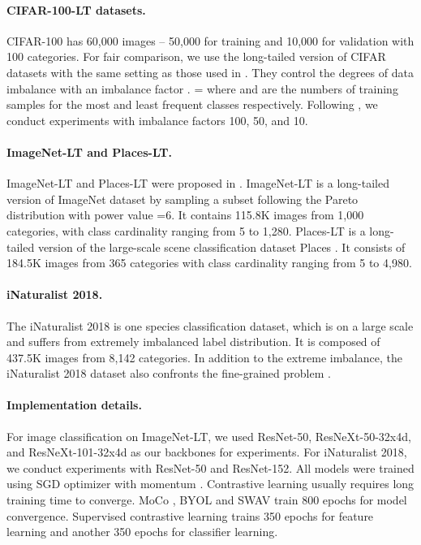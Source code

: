 \documentclass[10pt,twocolumn,letterpaper]{article}
\begin{document}
\paragraph{CIFAR-100-LT datasets.}
CIFAR-100 has 60,000 images -- 50,000 for training and 10,000 for validation with 100 categories. For fair comparison, we use the long-tailed version of CIFAR datasets with the same setting as those used in \cite{cao2019learning, zhou2019bbn, cb-focal}. They control the degrees of data imbalance with an imbalance factor . =  where  and  are the numbers of training samples for the most and least frequent classes respectively. Following \cite{zhou2019bbn}, we conduct experiments with imbalance factors 100, 50, and 10.

\paragraph{ImageNet-LT and Places-LT.}
ImageNet-LT and Places-LT were proposed in \cite{Liu_2019_CVPR}. ImageNet-LT is a long-tailed version of ImageNet dataset \cite{imagenet} by sampling a subset following the Pareto distribution with power value =6. It contains 115.8K images from 1,000 categories, with class cardinality ranging from 5 to 1,280. Places-LT is a long-tailed version of the large-scale scene classification dataset Places \cite{zhou2017places}. It consists of 184.5K images from 365 categories with class cardinality ranging from 5 to 4,980.

\paragraph{iNaturalist 2018.}
The iNaturalist 2018 \cite{van2018inaturalist} is one species classification dataset, which is on a large scale and suffers from extremely imbalanced label distribution. It is composed of 437.5K images from 8,142 categories. In addition to the extreme imbalance, the iNaturalist 2018 dataset also confronts the fine-grained problem \cite{wei2019piecewise}.

\paragraph{Implementation details.}
For image classification on ImageNet-LT, we used ResNet-50, ResNeXt-50-32x4d, and ResNeXt-101-32x4d as our backbones for experiments. For iNaturalist 2018, we conduct experiments with ResNet-50 and ResNet-152. All models were trained using SGD optimizer with momentum . Contrastive learning usually requires long training time to converge. MoCo \cite{DBLP:conf/cvpr/He0WXG20, DBLP:journals/corr/abs-2003-04297}, BYOL \cite{DBLP:conf/nips/GrillSATRBDPGAP20} and SWAV \cite{DBLP:conf/nips/CaronMMGBJ20} train 800 epochs for model convergence. Supervised contrastive learning \cite{DBLP:conf/nips/KhoslaTWSTIMLK20} trains 350 epochs for feature learning and another 350 epochs for classifier learning. 
\end{document}
